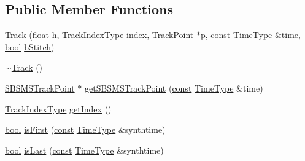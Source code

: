 \subsection*{Public Member Functions}
\begin{DoxyCompactItemize}
\item 
\hyperlink{class__sbsms___1_1_track_a403afd5dfcd304e9218efc6ab8bec2a6}{Track} (float \hyperlink{class__sbsms___1_1_track_ae66255351001740ba650b694987a43df}{h}, \hyperlink{namespace__sbsms___a92908dbd644f9cd709ffe3608e9e4510}{Track\+Index\+Type} \hyperlink{class__sbsms___1_1_track_ac88f811c1500da75972b991e9a825035}{index}, \hyperlink{class__sbsms___1_1_track_point}{Track\+Point} $\ast$\hyperlink{xmltok_8h_a94b60f3beb36ae85555d36dc9816769c}{p}, \hyperlink{getopt1_8c_a2c212835823e3c54a8ab6d95c652660e}{const} \hyperlink{namespace__sbsms___a3a161c3deff71e932c0ec86aad54eb7c}{Time\+Type} \&time, \hyperlink{mac_2config_2i386_2lib-src_2libsoxr_2soxr-config_8h_abb452686968e48b67397da5f97445f5b}{bool} \hyperlink{class__sbsms___1_1_track_aa9742b1b2512119291b7bb97427765e9}{b\+Stitch})
\item 
\hyperlink{class__sbsms___1_1_track_a416e75e66accc8eb9e3fafc3e8555216}{$\sim$\+Track} ()
\item 
\hyperlink{class__sbsms___1_1_s_b_s_m_s_track_point}{S\+B\+S\+M\+S\+Track\+Point} $\ast$ \hyperlink{class__sbsms___1_1_track_a8d13355c843a0e2037e2e29027cbd2b6}{get\+S\+B\+S\+M\+S\+Track\+Point} (\hyperlink{getopt1_8c_a2c212835823e3c54a8ab6d95c652660e}{const} \hyperlink{namespace__sbsms___a3a161c3deff71e932c0ec86aad54eb7c}{Time\+Type} \&time)
\item 
\hyperlink{namespace__sbsms___a92908dbd644f9cd709ffe3608e9e4510}{Track\+Index\+Type} \hyperlink{class__sbsms___1_1_track_a0d1f6929a27141670bab71d02a8427cf}{get\+Index} ()
\item 
\hyperlink{mac_2config_2i386_2lib-src_2libsoxr_2soxr-config_8h_abb452686968e48b67397da5f97445f5b}{bool} \hyperlink{class__sbsms___1_1_track_a929e9160c9fc4730348a00eb593e0893}{is\+First} (\hyperlink{getopt1_8c_a2c212835823e3c54a8ab6d95c652660e}{const} \hyperlink{namespace__sbsms___a3a161c3deff71e932c0ec86aad54eb7c}{Time\+Type} \&synthtime)
\item 
\hyperlink{mac_2config_2i386_2lib-src_2libsoxr_2soxr-config_8h_abb452686968e48b67397da5f97445f5b}{bool} \hyperlink{class__sbsms___1_1_track_a17872c1bd39dd08e25fe60a50a65f314}{is\+Last} (\hyperlink{getopt1_8c_a2c212835823e3c54a8ab6d95c652660e}{const} \hyperlink{namespace__sbsms___a3a161c3deff71e932c0ec86aad54eb7c}{Time\+Type} \&synthtime)
\end{DoxyCompactItemize}
